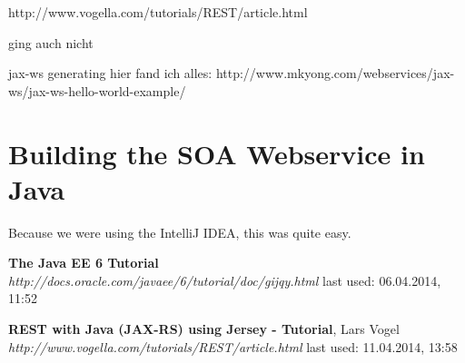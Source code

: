 \documentclass[12pt]{article}
\begin{document}
http://www.vogella.com/tutorials/REST/article.html

ging auch nicht


jax-ws generating
hier fand ich alles:
http://www.mkyong.com/webservices/jax-ws/jax-ws-hello-world-example/

\section{Building the SOA Webservice in Java}
Because we were using the IntelliJ IDEA, this was quite easy.

\newpage
\begin{thebibliography}{56}

   \textbf{The Java EE 6 Tutorial} \\
  \textit{http://docs.oracle.com/javaee/6/tutorial/doc/gijqy.html}
  \newline last used: 06.04.2014, 11:52
  
   \textbf{REST with Java (JAX-RS) using Jersey - Tutorial}, Lars Vogel\\
  \textit{  http://www.vogella.com/tutorials/REST/article.html}
  \newline last used: 11.04.2014, 13:58
\end{thebibliography}
\end{document}
